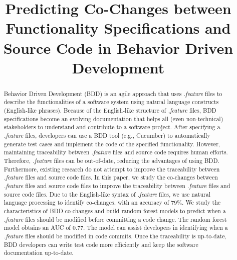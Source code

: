 \documentclass[10pt, conference, compsocconf]{IEEEtran}
\begin{document}
\title{Predicting Co-Changes between Functionality Specifications and Source Code in Behavior Driven Development}

\author{
	\and
	\and
	}

\maketitle

\begin{abstract}
Behavior Driven Development (BDD) is an agile approach that uses \textit{.feature} files to describe the functionalities of a software system using natural language constructs (English-like phrases). Because of the English-like structure of \textit{.feature} files, BDD specifications become an evolving documentation that helps all (even non-technical) stakeholders to understand and contribute to a software project. After specifying a \textit{.feature} files, developers can use a BDD tool (e.g., Cucumber) to automatically generate test cases and implement the code of the specified functionality. However, maintaining traceability between \textit{.feature} files and source code requires human efforts. Therefore, \textit{.feature} files can be out-of-date, reducing the advantages of using BDD. Furthermore, existing research do not attempt to improve the traceability between \textit{.feature} files and source code files. In this paper, we study the co-changes between \textit{.feature} files and source code files to improve the traceability between \textit{.feature} files and source code files. Due to the English-like syntax of \textit{.feature} files, we use natural language processing to identify co-changes, with an accuracy of 79\%. We study the characteristics of BDD co-changes and build random forest models to predict when a \textit{.feature} files should be modified before committing a code change. The random forest model obtains an AUC of 0.77. The model can assist developers in identifying when a \textit{.feature} files should be modified in code commits. Once the traceability is up-to-date, BDD developers can write test code more efficiently and keep the software documentation up-to-date. 
\end{abstract}
\end{document}
